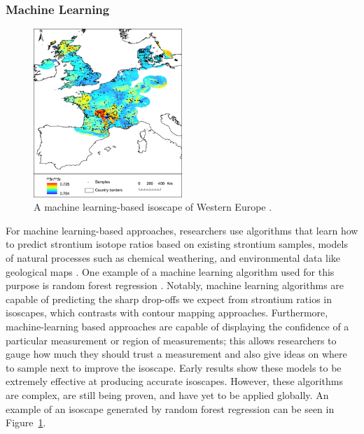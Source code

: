 \documentclass[a4paper, 12pt]{article}
\begin{document}
\subsubsection{Machine Learning}
\begin{figure}[htbp]
    \centering
    \includegraphics[width=0.5\textwidth]{machine_learning_isoscape.png}
    \caption{A machine learning-based isoscape of Western Europe \citep{bataille2018}.}
    \label{fig:machine_learning}
\end{figure}
For machine learning-based approaches, researchers use algorithms
that learn how to predict
strontium isotope ratios based on existing strontium samples, models of natural processes such as chemical weathering, and
environmental data like geological maps \citep{bataille2018}.
One example of a machine learning algorithm used for this purpose is random forest regression
\citep{bataille2018}. Notably, machine learning algorithms are capable of predicting
the sharp drop-offs we expect from strontium ratios in isoscapes, which contrasts
with contour mapping approaches. Furthermore, machine-learning based approaches are
capable of displaying the confidence of a particular measurement or region of
measurements; this allows researchers to gauge how much they should trust a measurement
and also give ideas on where to sample next to improve the isoscape.
Early results show these models to be extremely effective at producing accurate
isoscapes. However, these algorithms are complex, are still being proven, and have
yet to be applied globally. An example of an isoscape generated by random forest
regression can be seen in Figure~\ref{fig:machine_learning}.
\end{document}
